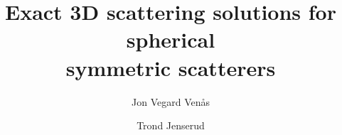\label{Part:paperI}
\renewcommand{\contents}{contents/e3Dss_article}%
\begin{pFrontmatter}
    \title{Exact 3D scattering solutions for spherical\\symmetric scatterers}
	\author[a,$\ast$]{Jon Vegard Ven{\aa}s}%
	\author[b]{Trond Jenserud}%
	\address[a]{Department of Mathematical Sciences, Norwegian University of Science and Technology,\\Alfred Getz' vei 1, 7034 Trondheim, Norway}%
	\address[b]{Department of Marine Systems, Norwegian Defence Research Establishment,\\Postboks 115, 3191 Horten, Norway}%
	\begin{abstract}%
		
	\end{abstract}%
\end{pFrontmatter}











\begin{inputAppendices}
	
	
	
	
\end{inputAppendices}

